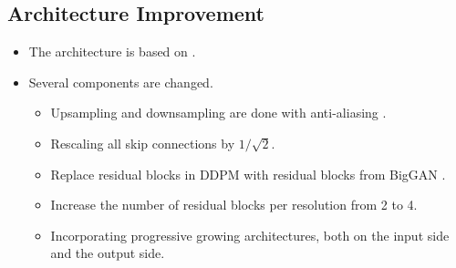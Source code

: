 \documentclass[10pt]{article}
\begin{document}
\subsection{Architecture Improvement}

\begin{itemize}
  \item The architecture is based on \cite{Ho:2020}.
  
  \item Several components are changed.
  \begin{itemize}
    \item Upsampling and downsampling are done with anti-aliasing \cite{Zhang:2019}.
    \item Rescaling all skip connections by $1/\sqrt{2}$.
    \item Replace residual blocks in DDPM with residual blocks from BigGAN \cite{Brock:2018}.
    \item Increase the number of residual blocks per resolution from 2 to 4.
    \item Incorporating progressive growing architectures, both on the input side and the output side.
  \end{itemize}
\end{itemize}


  
\end{document}
